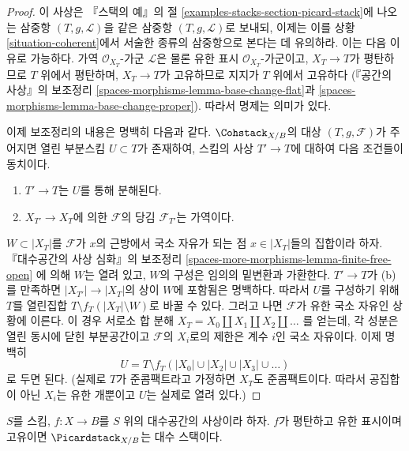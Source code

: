 \begin{proof}
이 사상은 『스택의 예』의 절
\ref{examples-stacks-section-picard-stack}에 나오는 삼중항
$(T, g, \mathcal{L})$을 같은 삼중항 $(T, g, \mathcal{L})$로 보내되,
이제는 이를 상황 \ref{situation-coherent}에서 서술한 종류의 삼중항으로
본다는 데 유의하라. 이는 다음 이유로 가능하다. 가역
$\mathcal{O}_{X_T}$-가군 $\mathcal{L}$은 물론 유한 표시
$\mathcal{O}_{X_T}$-가군이고, $X_T \to T$가 평탄하므로 $T$ 위에서
평탄하며, $X_T \to T$가 고유하므로 지지가 $T$ 위에서 고유하다
(『공간의 사상』의 보조정리 \ref{spaces-morphisms-lemma-base-change-flat}과
\ref{spaces-morphisms-lemma-base-change-proper}). 따라서 명제는 의미가 있다.

\medskip\noindent
이제 보조정리의 내용은 명백히 다음과 같다. $\Cohstack_{X/B}$의 대상
$(T, g, \mathcal{F})$가 주어지면 열린 부분스킴 $U \subset T$가 존재하여,
스킴의 사상 $T' \to T$에 대하여 다음 조건들이 동치이다.
\begin{enumerate}
\item[(a)] $T' \to T$는 $U$를 통해 분해된다.
\item[(b)] $X_{T'} \to X_T$에 의한 $\mathcal{F}$의 당김
$\mathcal{F}_{T'}$는 가역이다.
\end{enumerate}
$W \subset |X_T|$를 $\mathcal{F}$가 $x$의 근방에서 국소 자유가 되는
점 $x \in |X_T|$들의 집합이라 하자. 『대수공간의 사상 심화』의 보조정리
\ref{spaces-more-morphisms-lemma-finite-free-open}
에 의해 $W$는 열려 있고, $W$의 구성은 임의의 밑변환과 가환한다.
$T' \to T$가 (b)를 만족하면 $|X_{T'}| \to |X_T|$의 상이 $W$에
포함됨은 명백하다. 따라서 $U$를 구성하기 위해 $T$를 열린집합
$T \setminus f_T(|X_T| \setminus W)$로 바꿀 수 있다. 그러고 나면
$\mathcal{F}$가 유한 국소 자유인 상황에 이른다. 이 경우 서로소 합 분해
$X_T = X_0 \amalg X_1 \amalg X_2 \amalg \ldots$
를 얻는데, 각 성분은 열린 동시에 닫힌 부분공간이고 $\mathcal{F}$의
$X_i$로의 제한은 계수 $i$인 국소 자유이다. 이제 명백히
$$
U = T \setminus f_T(|X_0| \cup |X_2| \cup |X_3| \cup \ldots )
$$
로 두면 된다. %
(실제로 $T$가 준콤팩트라고 가정하면 $X_T$도 준콤팩트이다.
따라서 공집합이 아닌 $X_i$는 유한 개뿐이고 $U$는 실제로 열려 있다.)
\end{proof}

\begin{proposition}
\label{proposition-pic}
$S$를 스킴, $f : X \to B$를 $S$ 위의 대수공간의 사상이라 하자.
$f$가 평탄하고 유한 표시이며 고유이면 $\Picardstack_{X/B}$는
대수 스택이다.
\end{proposition}

